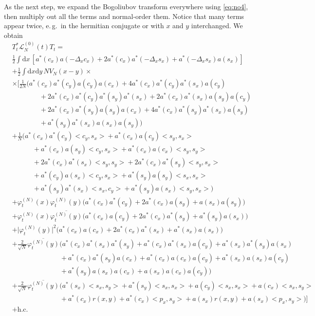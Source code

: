 \documentclass[11pt,a4paper,draft,DIV11]{scrartcl}	%
\newcommand{\di}{\textrm{d}}		%
\newcommand{\Lcal}{\mathcal{L}}		%
\newcommand{\hc}{\mbox{h.c.}}		%
\newcommand{\scal}[2]{\big<#1,#2\big>} %
\newcommand{\cc}[1]{\overline{#1}}	%
\newcommand{\ph}{\varphi_t^{(N)}}	%
\newcommand{\tagg}[1]{ \stepcounter{equation} \tag{\theequation} \label{eq:#1} } %
\newcommand{\eqr}[1]{\eqref{eq:#1}}			%
\begin{document}
As the next step, we expand the Bogoliubov transform everywhere using
\eqr{no4}, then multiply out all the terms and normal-order them. Notice that many terms appear twice, e.\,g.\ in the hermitian conjugate or with $x$ and $y$ interchanged. We obtain
\begin{align*}
& T^*_t \Lcal_N^{(0)}(t) T_t = \\ 
& \frac{1}{2} \int \di x\, \left[ a^*(c_x) a(-\Delta_x c_x) + \boxed{2 a^*(c_x) a^*(-\Delta_x s_x)} + a^*(-\Delta_x s_x) a(s_x) \right]\\%
& + \frac{1}{2}\int \di x \di y\, NV_N(x-y) \times \\
& \times \Big[   \frac{1}{2N}\bigg( a^*(c_x) a^*(c_y) a(c_y) a(c_x) + 4 a^*(c_x) a^*(c_y) a^*(s_x) a(c_y) \\
				      & \qquad\qquad + 2 a^*(c_x) a^*(c_y) a^*(s_y) a^*(s_x) + 2 a^*(c_x) a^*(s_x) a(s_y) a(c_y) \\
				      & \qquad\qquad + 2 a^*(c_x) a^*(s_y) a(s_y) a(c_x) + 4 a^*(c_x) a^*(s_y) a^*(s_x) a(s_y) \\
				      & \qquad\qquad + a^*(s_y) a^*(s_x) a(s_x) a(s_y) \bigg) \\
& + \frac{1}{N}\bigg(   \boxed{a^*(c_x)a^*(c_y) \scal{c_y}{s_x}} + a^*(c_x) a(c_y) \scal{s_y}{s_x}\\%
			& \qquad\quad + a^*(c_x) a(s_y) \scal{c_y}{s_x} + a^*(c_x) a(c_x) \scal{s_y}{s_y} \\
			& \qquad\quad + 2 a^*(c_x) a^*(s_x) \scal{s_y}{s_y} + 2a^*(c_x)a^*(s_y) \scal{s_y}{s_x} \\
			& \qquad\quad + a^*(c_y) a(s_x) \scal{c_y}{s_x} +  a^*(s_y) a(s_y) \scal{s_x}{s_x}\\
			& \qquad\quad + a^*(s_y) a^*(s_x) \scal{s_x}{c_y} + a^*(s_y) a(s_x) \scal{s_y}{s_x}   \bigg) \\
& + \ph(x)\ph(y) \Big( \boxed{a^*(c_x) a^*(c_y)} + 2 a^*(c_x) a(s_y) +a(s_x) a(s_y) \Big)\\%
& + \ph(x) \cc{\ph(y)} \Big( a^*(c_x) a(c_y) + 2 a^*(c_x) a^*(s_y) + a^*(s_y) a(s_x) \Big) \\
& + \lvert \ph(y) \rvert^2 \Big( a^*(c_x) a(c_x) + 2 a^*(c_x) a^*(s_x) + a^*(s_x) a(s_x) \Big) \\
& + \frac{2}{\sqrt{N}}\cc{\ph(y)} \bigg(    a^*(c_x) a^*(s_x) a^*(s_y) + a^*(c_x) a^*(s_x) a(c_y) + a^*(s_x) a^*(s_y) a(s_x)\\
					    & \qquad\qquad\qquad\quad + a^*(c_x) a^*(s_y) a(c_x) + a^*(c_x) a(c_x) a(c_y)+ a^*(s_x) a(s_x) a(c_y) \\
					    & \qquad\qquad\qquad\quad + a^*(s_y) a(s_x) a(c_x) + a(s_x) a(c_x) a(c_y)    \bigg) \\
& + \frac{2}{\sqrt{N}}\cc{\ph(y)} \bigg(    a^*(s_x) \scal{s_x}{s_y} + a^*(s_y) \scal{s_x}{s_x}  + a(c_y) \scal{s_x}{s_x} + a(c_x) \scal{s_x}{s_y} \\
					    & \qquad\qquad\qquad\quad + a^*(c_x)r(x,y) + a^*(c_x)\scal{p_x}{s_y} + a(s_x)r(x,y) + a(s_x)\scal{p_x}{s_y}		\bigg)    \Big]\\
& + \hc
\end{align*}
\end{document}
